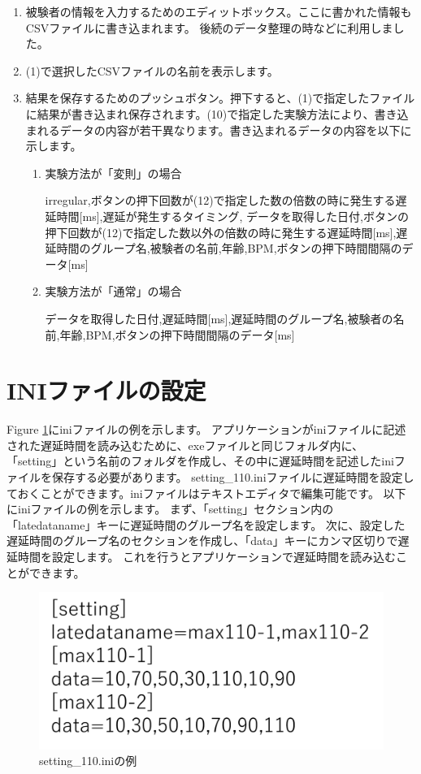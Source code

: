 \documentclass{article} %
\begin{document}
\begin{enumerate}
  \item 被験者の情報を入力するためのエディットボックス。ここに書かれた情報もCSVファイルに書き込まれます。
  後続のデータ整理の時などに利用しました。
  \item (1)で選択したCSVファイルの名前を表示します。
  \item 結果を保存するためのプッシュボタン。押下すると、(1)で指定したファイルに結果が書き込まれ保存されます。(10)で指定した実験方法により、書き込まれるデータの内容が若干異なります。書き込まれるデータの内容を以下に示します。
  \begin{enumerate}
    \item 実験方法が「変則」の場合
    
    irregular,ボタンの押下回数が(12)で指定した数の倍数の時に発生する遅延時間[ms],遅延が発生するタイミング, データを取得した日付,ボタンの押下回数が(12)で指定した数以外の倍数の時に発生する遅延時間[ms],遅延時間のグループ名,被験者の名前,年齢,BPM,ボタンの押下時間間隔のデータ[ms]
    \item 実験方法が「通常」の場合
    
    データを取得した日付,遅延時間[ms],遅延時間のグループ名,被験者の名前,年齢,BPM,ボタンの押下時間間隔のデータ[ms]
  \end{enumerate}
\end{enumerate}
\newpage
\section{INIファイルの設定}
Figure \ref{fig:ini-file}にiniファイルの例を示します。
アプリケーションがiniファイルに記述された遅延時間を読み込むために、exeファイルと同じフォルダ内に、
「setting」という名前のフォルダを作成し、その中に遅延時間を記述したiniファイルを保存する必要があります。
setting\_110.iniファイルに遅延時間を設定しておくことができます。iniファイルはテキストエディタで編集可能です。
以下にiniファイルの例を示します。
まず、「setting」セクション内の「latedataname」キーに遅延時間のグループ名を設定します。
次に、設定した遅延時間のグループ名のセクションを作成し、「data」キーにカンマ区切りで遅延時間を設定します。
これを行うとアプリケーションで遅延時間を読み込むことができます。
\begin{figure}[tbp]
  \centering
  \includegraphics[scale=0.3]{setting-ini.pdf}
  \caption{setting\_110.iniの例}
  \label{fig:ini-file}
\end{figure}
\end{document}
